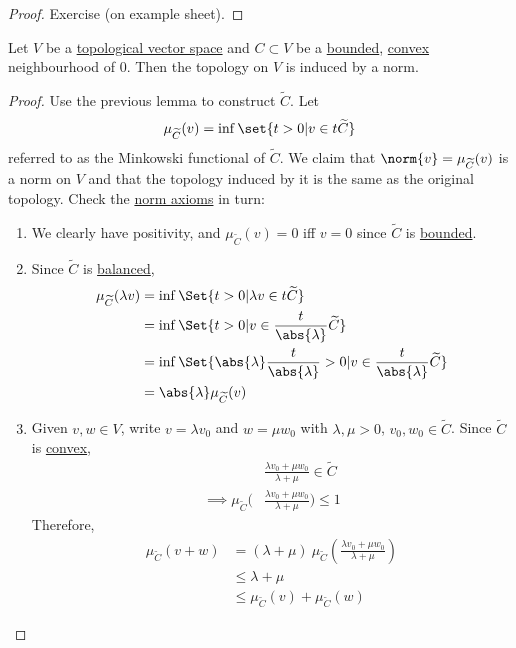 \documentclass{article}
\begin{document}
\begin{proof}
    Exercise (on example sheet).
\end{proof}

\begin{prop}
    Let $V$ be a \hyperlink{def:topologicalVectorSpace}{topological vector space} and $C \subset V$ be a \hyperlink{def:boundedSubs}{bounded}, \hyperlink{def:convexSubs}{convex} neighbourhood of $0$. Then the topology on $V$ is induced by a norm.
\end{prop}

\begin{proof}
    Use the previous lemma to construct $\widetilde C$. Let
    \begin{equation*}
        \mu_{\widetilde C}(v) = \inf\set{t > 0 | v \in t \widetilde C}
    \end{equation*}
    referred to as the Minkowski functional of $\widetilde C$.
    We claim that $\norm{v} = \mu_{\widetilde C}(v)$ is a norm on $V$ and that the topology induced by it is the same as the original topology.
    Check the \hyperlink{def:normedVectorSpace}{norm axioms} in turn:
    \begin{enumerate}[label=\roman*.]
        \item We clearly have positivity, and $\mu_{\widetilde C}(v) = 0$ iff $v = 0$ since $\widetilde C$ is \hyperlink{def:boundedSubs}{bounded}.
        \item Since $\widetilde C$ is \hyperlink{def:balancedSubs}{balanced},
            \begin{align*}
                \mu_{\widetilde C} (\lambda v) &= \inf\Set{t > 0 | \lambda v \in t \widetilde C} \\
                &= \inf\Set{t > 0 | v \in \frac{t}{\abs{\lambda}} \widetilde C} \\
                &= \inf\Set{\abs{\lambda} \frac{t}{\abs{\lambda}} > 0 | v \in \frac{t}{\abs{\lambda}} \widetilde C} \\
                &= \abs{\lambda} \mu_{\widetilde C}(v)
            \end{align*}
        \item Given $v, w \in V$, write $v = \lambda v_0$ and $w = \mu w_0$ with $\lambda, \mu > 0$, $v_0, w_0 \in \widetilde C$.
            Since $\widetilde C$ is \hyperlink{def:convexSubs}{convex},
            \begin{align*}
                &\frac{\lambda v_0 + \mu w_0}{\lambda + \mu} \in \widetilde C \\
                \implies \mu_{\widetilde C} \bigg(&\frac{\lambda v_0 + \mu w_0}{\lambda + \mu}\bigg) \leq 1
            \end{align*}
            Therefore,
            \begin{align*}
                \mu_{\widetilde C} (v + w) &= (\lambda + \mu) \ \mu_{\widetilde C} \left(\frac{\lambda v_0 + \mu w_0}{\lambda + \mu}\right) \\
                &\leq \lambda + \mu \\
                &\leq \mu_{\widetilde C}(v) + \mu_{\widetilde C}(w)
            \end{align*}
    \end{enumerate}
\end{proof}
\end{document}
